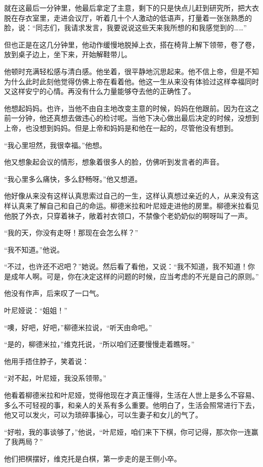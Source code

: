 就在这最后一分钟里，他最后拿定了主意，剩下的只是快点儿赶到研究所，把大衣脱在存衣室里，走进会议厅，听着几十个人激动的低语声，打量着一张张熟悉的脸，说：“同志们，我请求发言，我要说说这些天来我所想的和我感觉到的……”

但也正是在这几分钟里，他动作缓慢地脱掉上衣，搭在椅背上解下领带，卷了卷，放到桌子边上，坐下来，开始解鞋带儿。

他顿时充满轻松感与清白感。他坐着，很平静地沉思起来。他不信上帝，但是不知为什么此时此刻他觉得仿佛上帝在看着他。他这一生从来没有体验过这样幸福同时又这样安宁的心情。再没有什么力量能够夺去他的正确性了。

他想起妈妈。也许，当他不由自主地改变主意的时候，妈妈在他跟前。因为在这之前一分钟，他还真想去做违心的检讨呢。当他下决心做出最后决定的时候，没想到上帝，也没想到妈妈。但是上帝和妈妈是和他在一起的，尽管他没有想到。

“我心里坦然，我很幸福。”他想。

他又想象起会议的情形，想象着很多人的脸，仿佛听到发言者的声音。

“我心里多么痛快，多么舒畅呀。”他又想道。

他好像从来没有这样认真思索过自己的一生，这样认真想过亲近的人，从来没有这样认真来了解自己和自己的命运。柳德米拉和叶尼娅走进他的房里。柳德米拉看见他脱了外衣，只穿着袜子，敞着衬衣领口，不禁像个老奶奶似的啊呀叫了一声。

“我的天，你没有走呀！那现在会怎么样？”

“我不知道。”他说。

“不过，也许还不迟吧？”她说。然后看了看他，又说：“我不知道，我不知道！你是成年人啊。可是，你在决定这样的问题的时候，应当考虑的不光是自己的原则。”

他没有作声，后来叹了一口气。

叶尼娅说：“姐姐！”

“噢，好吧，好吧，”柳德米拉说，“听天由命吧。”

“是的，柳德米拉，”维克托说，“所以咱们还要慢慢走着瞧呀。”

他用手捂住脖子，笑着说：

“对不起，叶尼娅，我没系领带。”

他看着柳德米拉和叶尼娅，觉得他现在才真正懂得，生活在人世上是多么不容易、多么不可轻视的事，和亲人的关系有多么重要。他明白了，生活会照常进行下去，他又可以发火，可以为琐碎事操心，可以生妻子和女儿的气了。

“好啦，我的事谈够了，”他说，“叶尼娅，咱们来下下棋，你可记得，那次你一连赢了我两局？”

他们把棋摆好，维克托是白棋，第一步走的是王侧小卒。

